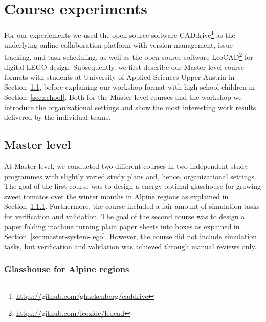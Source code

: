 \documentclass{PDS}
\begin{document}
\section{Course experiments}
\label{sec:contribution}

For our experiements we used the open source software CADdrive\footnote{\url{https://github.com/ghackenberg/caddrive}} as the underlying online collaboration platform with version management, issue tracking, and task scheduling, as well as the open source software LeoCAD\footnote{\url{https://github.com/leozide/leocad}} for digital LEGO design.
Subsequently, we first describe our Master-level course formats with students at University of Applied Sciences Upper Austria in Section~\ref{sec:master}, before explaining our workshop format with high school children in Section~\ref{sec:school}.
Both for the Master-level courses and the workshop we introduce the organizational settings and show the most interesting work results delivered by the individual teams.

\subsection{Master level}
\label{sec:master}

At Master level, we conducted two different courses in two independent study programmes with slightly varied study plans and, hence, organizational settings.
The goal of the first course was to design a energy-optimal glasshouse for growing sweet tomatos over the winter months in Alpine regions as explained in Section~\ref{sec:master-product-lego}.
Furthermore, the course included a fair amount of simulation tasks for verification and validation.
The goal of the second course was to design a paper folding machine turning plain paper sheets into boxes as expained in Section~\ref{sec:master-system-lego}.
However, the course did not include simulation tasks, but verification and validation was achieved through manual reviews only.

\subsubsection{Glasshouse for Alpine regions}
\label{sec:master-product-lego}
\end{document}
